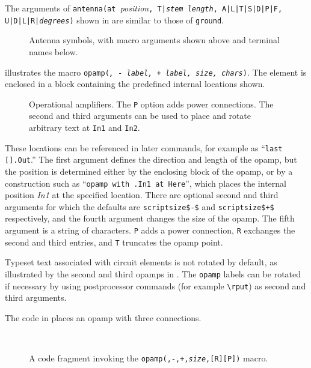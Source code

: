The arguments of
{\tt antenna(at }{\sl position}{\tt,
  T|{\sl stem length}, A|L|T|S|D|P|F, U|D|L|R|{\sl degrees})}
shown in  are similar to those of {\tt ground}.
\begin{figure}[h!]
   
   \caption{Antenna symbols, with macro arguments shown above and
     terminal names below.}
   \label{Antennas}
   \end{figure}

 illustrates the macro
{\tt opamp({\sl\linespec, - label, + label, size, chars})\label{OPAMP}}.
The element is enclosed in a block
containing the predefined internal locations shown.
\begin{figure}[ht]
   
   \caption{Operational amplifiers.  The {\tt P} option adds
     power connections.  The second and third arguments can be used
     to place and rotate arbitrary text at {\tt In1} and {\tt In2}.}
   \label{Opamp}
   \end{figure}
These locations can be referenced in later
commands, for example as ``{\tt last [].Out}.''
The first argument defines the direction and length of the opamp, but the
position is determined either by the enclosing block of the opamp,
or by a construction such as ``{\tt opamp with .In1 at Here}'', which places
the internal position {\sl In1} at the specified location.
There are optional second and third arguments for which the defaults
are {\tt {}scriptsize\$-\$} and {\tt {}scriptsize\$+\$}
respectively, and the fourth argument changes the size of the opamp.
The fifth argument is a string of characters.  {\tt P}
adds a power connection, {\tt R} exchanges the second and
third entries, and {\tt T} truncates the opamp point.

\enlargethispage{\baselineskip}
Typeset text associated with circuit elements is not rotated by default,
as illustrated by the second and third opamps in .
The {\tt opamp} labels can be rotated if necessary by 
using postprocessor commands (for example \PSTricks \verb|\rput|)
as second and third arguments.

The code in  places an opamp with three connections.
\begin{figure}[h!b]
   \parbox{4in}{\small }%
   \quad\raise-0.2in\hbox{ }%
   \caption{A code fragment invoking the
    {\tt opamp(\linespec,-,+,{\sl size},[R][P])} macro.}
   \label{opampex}
   \end{figure}

